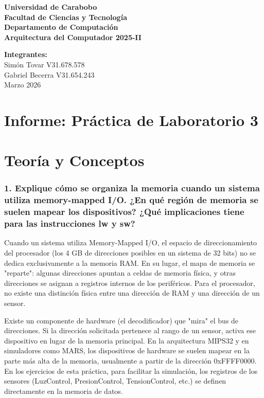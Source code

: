 \documentclass[12pt,a4paper]{article}
\begin{document}
\begin{center}
    \textbf{\Large Universidad de Carabobo}\\
    \textbf{Facultad de Ciencias y Tecnología}\\
    \textbf{Departamento de Computación}\\
    \textbf{Arquitectura del Computador 2025-II}
\end{center}

\vspace{0.5cm}

\begin{flushright}
    \textbf{Integrantes:}\\
    Simón Tovar V31.678.578\\Gabriel Becerra V31.654.243\\
    Marzo 2026
\end{flushright}

\section*{Informe: Práctica de Laboratorio 3}

\tableofcontents
\newpage 

\section{Teoría y Conceptos}

\subsubsection{1. Explique cómo se organiza la memoria cuando un sistema utiliza memory-mapped I/O. ¿En qué región de memoria se suelen mapear los dispositivos? ¿Qué implicaciones tiene para las instrucciones lw y sw?}

Cuando un sistema utiliza Memory-Mapped I/O, el espacio de direccionamiento del procesador (los 4 GB de direcciones posibles en un sistema de 32 bits) no se dedica exclusivamente a la memoria RAM. En su lugar, el mapa de memoria se "reparte": algunas direcciones apuntan a celdas de memoria física, y otras direcciones se asignan a registros internos de los periféricos. Para el procesador, no existe una distinción física entre una dirección de RAM y una dirección de un sensor.

Existe un componente de hardware (el decodificador) que "mira" el bus de direcciones. Si la dirección solicitada pertenece al rango de un sensor, activa ese dispositivo en lugar de la memoria principal. En la arquitectura MIPS32 y en simuladores como MARS, los dispositivos de hardware se suelen mapear en la parte más alta de la memoria, usualmente a partir de la dirección 0xFFFF0000. En los ejercicios de esta práctica, para facilitar la simulación, los registros de los sensores (LuzControl, PresionControl, TensionControl, etc.) se definen directamente en la memoria de datos.
\end{document}
